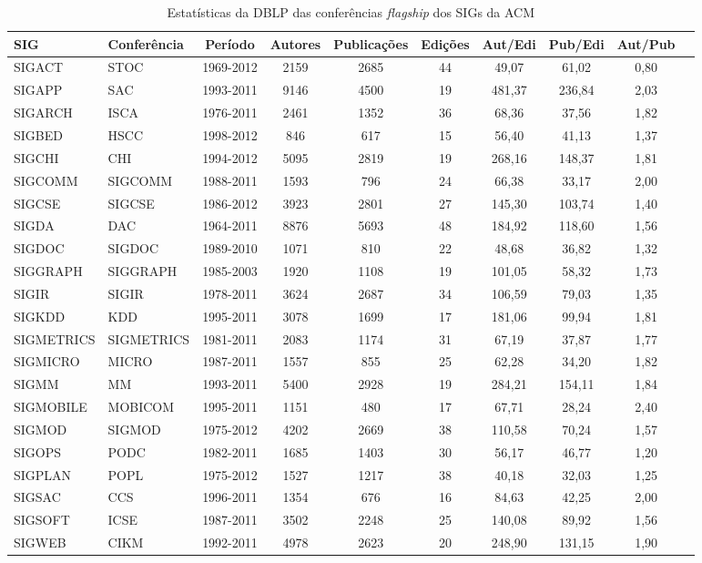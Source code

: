 \begin{table}[!htb]
\centering
\caption{Estatísticas da DBLP das conferências \textit{flagship} dos SIGs da ACM }
\label{tab:sigs_conference_period}
{\fontsize{6.2}{10}\selectfont
\begin{tabular}{|l|l|c|c|c|c|c|c|c|c|} \hline
\textbf{SIG} & \textbf{Conferência} & \textbf{Período} & \textbf{Autores} & \textbf{Publicações} & \textbf{Edições} & \textbf{Aut/Edi} & \textbf{Pub/Edi} & \textbf{Aut/Pub}\\ \hline
SIGACT & STOC & 1969-2012 & 2159 & 2685 & 44 & 49,07 & 61,02 & 0,80\\ \hline
SIGAPP & SAC & 1993-2011 & 9146 & 4500 & 19 & 481,37 & 236,84 & 2,03\\ \hline
SIGARCH & ISCA & 1976-2011 & 2461 & 1352 & 36 & 68,36 & 37,56 & 1,82\\ \hline
SIGBED & HSCC & 1998-2012 & 846 & 617 & 15 & 56,40 & 41,13 & 1,37\\ \hline
SIGCHI & CHI & 1994-2012 & 5095 & 2819 & 19 & 268,16 & 148,37 & 1,81\\ \hline
SIGCOMM & SIGCOMM & 1988-2011 & 1593 & 796 & 24 & 66,38 & 33,17 & 2,00\\ \hline
SIGCSE & SIGCSE & 1986-2012 & 3923 & 2801 & 27 & 145,30 & 103,74 & 1,40\\ \hline
SIGDA & DAC & 1964-2011 & 8876 & 5693 & 48 & 184,92 & 118,60 & 1,56\\ \hline
SIGDOC & SIGDOC & 1989-2010 & 1071 & 810 & 22 & 48,68 & 36,82 & 1,32\\ \hline
SIGGRAPH & SIGGRAPH & 1985-2003 & 1920 & 1108 & 19 & 101,05 & 58,32 & 1,73\\ \hline
SIGIR & SIGIR & 1978-2011 & 3624 & 2687 & 34 & 106,59 & 79,03 & 1,35\\ \hline
SIGKDD & KDD & 1995-2011 & 3078 & 1699 & 17 & 181,06 & 99,94 & 1,81\\ \hline
SIGMETRICS & SIGMETRICS & 1981-2011 & 2083 & 1174 & 31 & 67,19 & 37,87 & 1,77\\ \hline
SIGMICRO & MICRO & 1987-2011 & 1557 & 855 & 25 & 62,28 & 34,20 & 1,82\\ \hline
SIGMM & MM & 1993-2011 & 5400 & 2928 & 19 & 284,21 & 154,11 & 1,84\\ \hline
SIGMOBILE & MOBICOM & 1995-2011 & 1151 & 480 & 17 & 67,71 & 28,24 & 2,40\\ \hline
SIGMOD & SIGMOD & 1975-2012 & 4202 & 2669 & 38 & 110,58 & 70,24 & 1,57\\ \hline
SIGOPS & PODC & 1982-2011 & 1685 & 1403 & 30 & 56,17 & 46,77 & 1,20\\ \hline
SIGPLAN & POPL & 1975-2012 & 1527 & 1217 & 38 & 40,18 & 32,03 & 1,25\\ \hline
SIGSAC & CCS & 1996-2011 & 1354 & 676 & 16 & 84,63 & 42,25 & 2,00\\ \hline
SIGSOFT & ICSE & 1987-2011 & 3502 & 2248 & 25 & 140,08 & 89,92 & 1,56\\ \hline
SIGWEB & CIKM & 1992-2011 & 4978 & 2623 & 20 & 248,90 & 131,15 & 1,90\\ \hline
\end{tabular}
}
\end{table}
